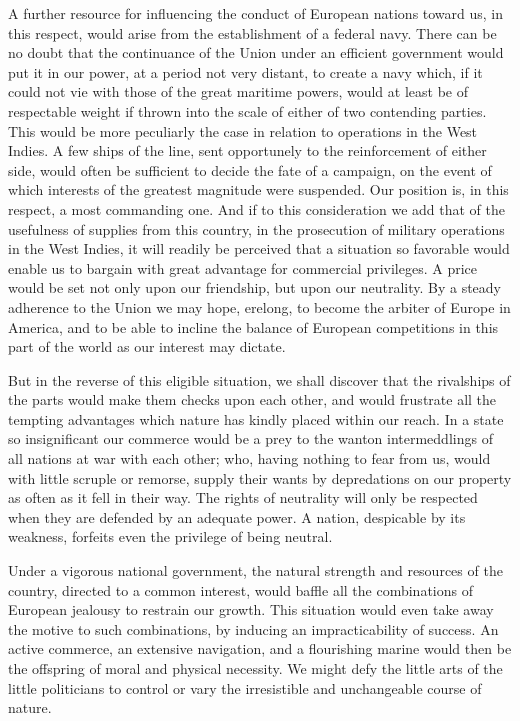 A further resource for influencing the conduct of European nations toward us, in this respect, would arise from the establishment of a federal navy. There can be no doubt that the continuance of the Union under an efficient government would put it in our power, at a period not very distant, to create a navy which, if it could not vie with those of the great maritime powers, would at least be of respectable weight if thrown into the scale of either of two contending parties. This would be more peculiarly the case in relation to operations in the West Indies. A few ships of the line, sent opportunely to the reinforcement of either side, would often be sufficient to decide the fate of a campaign, on the event of which interests of the greatest magnitude were suspended. Our position is, in this respect, a most commanding one. And if to this consideration we add that of the usefulness of supplies from this country, in the prosecution of military operations in the West Indies, it will readily be perceived that a situation so favorable would enable us to bargain with great advantage for commercial privileges. A price would be set not only upon our friendship, but upon our neutrality. By a steady adherence to the Union we may hope, erelong, to become the arbiter of Europe in America, and to be able to incline the balance of European competitions in this part of the world as our interest may dictate.

But in the reverse of this eligible situation, we shall discover that the rivalships of the parts would make them checks upon each other, and would frustrate all the tempting advantages which nature has kindly placed within our reach. In a state so insignificant our commerce would be a prey to the wanton intermeddlings of all nations at war with each other; who, having nothing to fear from us, would with little scruple or remorse, supply their wants by depredations on our property as often as it fell in their way. The rights of neutrality will only be respected when they are defended by an adequate power. A nation, despicable by its weakness, forfeits even the privilege of being neutral.

Under a vigorous national government, the natural strength and resources of the country, directed to a common interest, would baffle all the combinations of European jealousy to restrain our growth. This situation would even take away the motive to such combinations, by inducing an impracticability of success. An active commerce, an extensive navigation, and a flourishing marine would then be the offspring of moral and physical necessity. We might defy the little arts of the little politicians to control or vary the irresistible and unchangeable course of nature.

